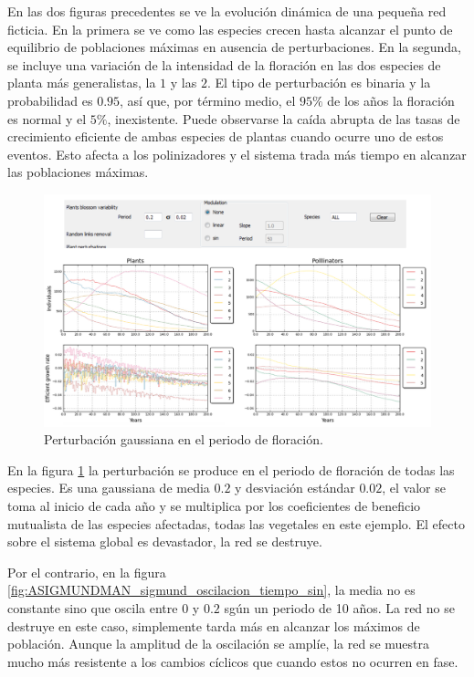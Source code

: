 \clearpage
En las dos figuras precedentes se ve la evolución dinámica de una pequeña red ficticia. En la primera se ve como las especies crecen hasta alcanzar el punto de equilibrio de poblaciones máximas en ausencia de perturbaciones. En la segunda, se incluye una variación de la intensidad de la floración en las dos especies de planta más generalistas, la $1$ y las $2$. El tipo de perturbación es binaria y la probabilidad es $0.95$, así que, por término medio, el $95\%$ de los años la floración es normal y el $5\%$, inexistente. Puede observarse la caída abrupta de las tasas
de crecimiento eficiente de ambas especies de plantas cuando ocurre uno de estos eventos. Esto afecta a los polinizadores y el sistema trada más tiempo en alcanzar las poblaciones máximas.

\begin{figure}[h!]
\centering
\includegraphics[scale=1]{ManFigs/sigmund_oscilacion_tiempo_none.png}
\caption{Perturbación gaussiana en el periodo de floración.}
\label{fig:ASIGMUNDMAN_sigmund_oscilacion_tiempo_none}
\end{figure}

En la figura \ref{fig:ASIGMUNDMAN_sigmund_oscilacion_tiempo_none} la perturbación se produce en el periodo de floración de todas las especies. Es una gaussiana de media $0.2$ y desviación estándar $0.02$, el valor se toma al inicio de cada año y se multiplica por los coeficientes de beneficio mutualista de las especies afectadas, todas las vegetales en este ejemplo. El efecto sobre el sistema global es devastador, la red se destruye.


Por el contrario, en la figura \ref{fig:ASIGMUNDMAN_sigmund_oscilacion_tiempo_sin}, la media no es constante sino que oscila entre $0$ y $0.2$ sgún un periodo de 10 años. La red no se destruye en este caso, simplemente tarda más en alcanzar los máximos de población. Aunque la amplitud de la oscilación se amplíe, la red se muestra mucho más resistente a los cambios cíclicos que cuando estos no ocurren en fase.

